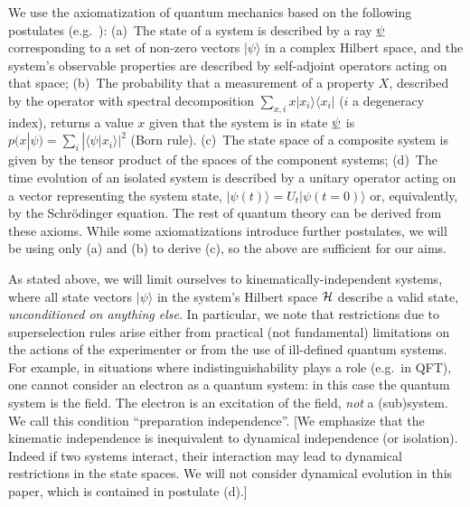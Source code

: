 \documentclass[aps,prl,amsmath,amssymb,twocolumn,nofootinbib]{revtex4}
\theoremstyle{plain}
\theoremstyle{definition}
\theoremstyle{remark}
\newcommand{\pj}[1] {\underbar{$#1$}}
\def\>{\rangle}
\def\<{\langle}
\def\commentg#1{ [{\bf Comment Gabriele:} {\sf #1}]}
\def\togli#1{}
\begin{document}
	We use the axiomatization of quantum mechanics based on the following
	postulates (e.g.~\cite{ozawa,masanes,wootters,nielsenchuang}): (a)~The state of a
	system is described by a ray $\pj{\psi}$ corresponding to a set of
	non-zero vectors $|\psi\>$ in a complex Hilbert space, and the
	system's observable properties are described by self-adjoint operators
	acting on that space; (b)~The probability that a measurement of a
	property $X$, described by the operator with spectral decomposition
	$\sum_{x,i}x|x_i\>\<x_i|$ ($i$ a degeneracy index), returns a value
	$x$ given that the system is in state $\pj{\psi}$ is
	$p(x|\psi)=\sum_i|\<\psi|x_i\>|^2$ (Born rule). (c)~The state
	space of a composite system is given by the tensor product of the
	spaces of the component systems; (d)~The time evolution of an isolated
	system is described by a unitary operator acting on a vector
	representing the system state, $|\psi({t})\>=U_{t}|\psi({t}=0)\>$ or,
	equivalently, by the Schr\"odinger equation. The rest of quantum
	theory can be derived from these axioms. While some axiomatizations
	introduce further postulates, we will be using only (a) and (b) to
	derive (c), so the above are sufficient for our aims.
	
	\togli{This axiomatization implicitly contains a definition of
		``quantum system'' which is crucial for what follows, so we need to
		clarify the assumptions that it contains. We will use the following
		definition for a quantum system\togli{$\stackon[1pt]={\mbox{\tiny
					def}}$}$\stackrel{\mbox{\tiny def}}=${\em ``a quantum degree
			of freedom with $d$ (possibly discrete, or continuous, infinite)
			mutually exclusive (commuting) values for each of its properties.
			Its mathematical description is through a Hilbert space of
			dimension $d$ which contains all the states that describe the
			values of its possible properties. In accordance with the
			postulate (a), these values correspond to a basis of the space,
			given by the eigenvectors of the observable corresponding to that
			property''}. \commentg{We may have to revise to be more clear.
			Where is this used?} } As stated above, we will limit ourselves to
	kinematically-independent systems, where all state vectors $|\psi\>$
	in the system's Hilbert space $\cal H$ describe a valid state, {\em
		unconditioned on anything else}. In particular, we note that
	restrictions due to superselection rules arise either from practical
	(not fundamental) limitations on the actions of the experimenter
	\cite{susskind,zanardi,zanardilloyd} or from the use of ill-defined
	quantum systems. For example, in situations where indistinguishability
	plays a role (e.g.~in QFT), one cannot consider an electron as a
	quantum system: in this case the quantum system is the field. The
	electron is an excitation of the field, {\em not} a (sub)system. We
	call this condition ``preparation independence''.  [We emphasize that
	the kinematic independence is inequivalent to dynamical independence
	(or isolation).  Indeed if two systems interact, their interaction may
	lead to dynamical restrictions in the state spaces. We will not
	consider dynamical evolution in this paper, which is contained in
	postulate (d).]
	
\end{document}

